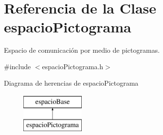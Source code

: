 \hypertarget{classespacio_pictograma}{}\section{Referencia de la Clase espacio\+Pictograma}
\label{classespacio_pictograma}


Espacio de comunicación por medio de pictogramas.  




{\ttfamily \#include $<$espacio\+Pictograma.\+h$>$}

Diagrama de herencias de espacio\+Pictograma\begin{figure}[H]
\begin{center}
\leavevmode
\includegraphics[height=2.000000cm]{classespacio_pictograma}
\end{center}
\end{figure}
